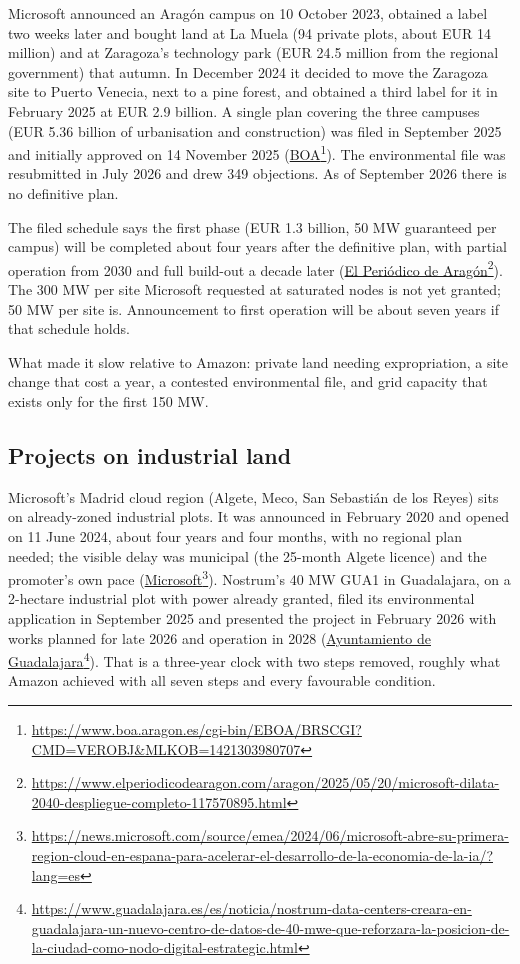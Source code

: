 \documentclass[11pt]{article}
\newcommand{\src}[2]{\href{#1}{#2}\footnote{\url{#1}}}
\begin{document}
Microsoft announced an Aragón campus on 10 October 2023, obtained a label two weeks later and bought land at La Muela (94 private plots, about EUR 14 million) and at Zaragoza's technology park (EUR 24.5 million from the regional government) that autumn. In December 2024 it decided to move the Zaragoza site to Puerto Venecia, next to a pine forest, and obtained a third label for it in February 2025 at EUR 2.9 billion. A single plan covering the three campuses (EUR 5.36 billion of urbanisation and construction) was filed in September 2025 and initially approved on 14 November 2025 (\src{https://www.boa.aragon.es/cgi-bin/EBOA/BRSCGI?CMD=VEROBJ&MLKOB=1421303980707}{BOA}). The environmental file was resubmitted in July 2026 and drew 349 objections. As of September 2026 there is no definitive plan.

The filed schedule says the first phase (EUR 1.3 billion, 50 MW guaranteed per campus) will be completed about four years after the definitive plan, with partial operation from 2030 and full build-out a decade later (\src{https://www.elperiodicodearagon.com/aragon/2025/05/20/microsoft-dilata-2040-despliegue-completo-117570895.html}{El Periódico de Aragón}). The 300 MW per site Microsoft requested at saturated nodes is not yet granted; 50 MW per site is. Announcement to first operation will be about seven years if that schedule holds.

What made it slow relative to Amazon: private land needing expropriation, a site change that cost a year, a contested environmental file, and grid capacity that exists only for the first 150 MW.

\subsection{Projects on industrial land}

Microsoft's Madrid cloud region (Algete, Meco, San Sebastián de los Reyes) sits on already-zoned industrial plots. It was announced in February 2020 and opened on 11 June 2024, about four years and four months, with no regional plan needed; the visible delay was municipal (the 25-month Algete licence) and the promoter's own pace (\src{https://news.microsoft.com/source/emea/2024/06/microsoft-abre-su-primera-region-cloud-en-espana-para-acelerar-el-desarrollo-de-la-economia-de-la-ia/?lang=es}{Microsoft}). Nostrum's 40 MW GUA1 in Guadalajara, on a 2-hectare industrial plot with power already granted, filed its environmental application in September 2025 and presented the project in February 2026 with works planned for late 2026 and operation in 2028 (\src{https://www.guadalajara.es/es/noticia/nostrum-data-centers-creara-en-guadalajara-un-nuevo-centro-de-datos-de-40-mwe-que-reforzara-la-posicion-de-la-ciudad-como-nodo-digital-estrategic.html}{Ayuntamiento de Guadalajara}). That is a three-year clock with two steps removed, roughly what Amazon achieved with all seven steps and every favourable condition.
\end{document}
